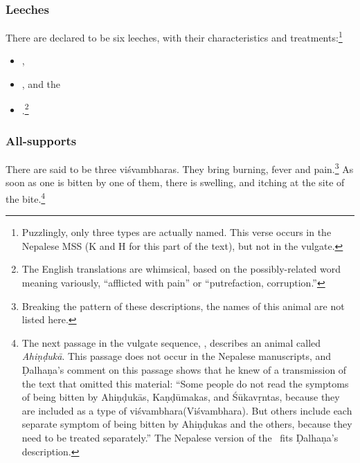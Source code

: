 \begin{translation}
\subsubsection{Leeches}

\item[31 add]

There are declared to be six leeches, with their characteristics and 
treatments:\footnote{Puzzlingly, only three types are actually named.  This verse 
occurs in the Nepalese MSS (K and H for this part of the text), but not in the 
vulgate.}
\begin{itemize}
    \item {},
    \item {}, and the
    \item {}.\footnote{The English translations are 
    whimsical, based on the possibly-related word  meaning variously, 
    “afflicted with pain” or “putrefaction, corruption.”}
\end{itemize}

\subsubsection{All-supports}
\item[32 verse]

There are said to be three \Glspl{viśvambhara}.  They bring burning, fever and
pain.\footnote{Breaking the pattern of these descriptions, the names
    of this animal are not listed here.} As soon as one is bitten by one
    of them, there is swelling, and itching at the site of the
    bite.\footnote{The next passage in the vulgate sequence,
        , describes an animal called \emph{Ahiṇḍukā}.  This
        passage does not occur in the Nepalese manuscripts, and Ḍalhaṇa's
        comment on this passage shows that he knew of a transmission of the
        text that omitted this material:  “Some people do not read the
        symptoms of being bitten by Ahiṇḍukās, Kaṇḍūmakas, and Śūkavṛntas,
        because they are included as a type of \Gls{viśvambhara}(Viśvambhara).
        But others include each separate symptom of being bitten by Ahiṇḍukas
        and the others, because they need to be treated separately.”    The
        Nepalese version of the \SS\ fits Ḍalhaṇa's description.}
   
\item[34 verses 1, 2]   


\end{translation}
